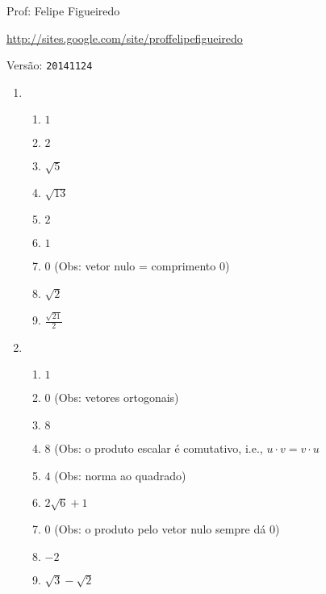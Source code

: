\documentclass[a4paper]{article}
\begin{document}
\parbox[c]{.825\textwidth}{\raggedright%
{Prof: Felipe Figueiredo\par}
{\url{http://sites.google.com/site/proffelipefigueiredo}\par}
}

Versão: \verb|20141124|




\begin{enumerate}
\item 

  \begin{enumerate}
  \item $1$
  \item $2$
  \item $\sqrt{5}$
  \item $\sqrt{13}$
  \item $2$
  \item $1$
  \item $0$ (Obs: vetor nulo = comprimento $0$)
  \item $\sqrt{2}$
  \item $\frac{\sqrt{21}}{2}$
  \end{enumerate}

\item 

  \begin{enumerate}
  \item $1$
  \item $0$ (Obs: vetores ortogonais)
  \item $8$
  \item $8$ (Obs: o produto escalar é comutativo, i.e., $u \cdot v = v
    \cdot u$
  \item $4$ (Obs: norma ao quadrado)
  \item $2\sqrt{6}+1$
  \item $0$ (Obs: o produto pelo vetor nulo sempre dá $0$)
  \item $-2$
  \item $\sqrt{3} - \sqrt{2}$
  \end{enumerate}


\end{enumerate}
\end{document}
